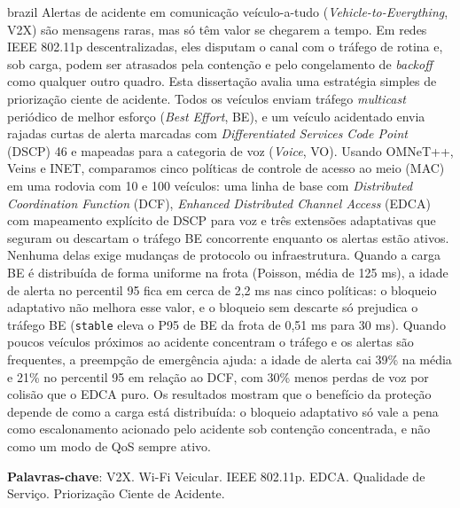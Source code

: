 \setlength{\absparsep}{18pt} %
\begin{resumo}[Resumo]
	\SingleSpacing
	\begin{otherlanguage*}{brazil}
	Alertas de acidente em comunicação veículo-a-tudo (\emph{Vehicle-to-Everything}, V2X) são mensagens raras, mas só têm valor se chegarem a tempo. Em redes IEEE 802.11p descentralizadas, eles disputam o canal com o tráfego de rotina e, sob carga, podem ser atrasados pela contenção e pelo congelamento de \emph{backoff} como qualquer outro quadro. Esta dissertação avalia uma estratégia simples de priorização ciente de acidente. Todos os veículos enviam tráfego \emph{multicast} periódico de melhor esforço (\emph{Best Effort}, BE), e um veículo acidentado envia rajadas curtas de alerta marcadas com \emph{Differentiated Services Code Point} (DSCP) 46 e mapeadas para a categoria de voz (\emph{Voice}, VO). Usando OMNeT++, Veins e INET, comparamos cinco políticas de controle de acesso ao meio (MAC) em uma rodovia com 10 e 100 veículos: uma linha de base com \emph{Distributed Coordination Function} (DCF), \emph{Enhanced Distributed Channel Access} (EDCA) com mapeamento explícito de DSCP para voz e três extensões adaptativas que seguram ou descartam o tráfego BE concorrente enquanto os alertas estão ativos. Nenhuma delas exige mudanças de protocolo ou infraestrutura. Quando a carga BE é distribuída de forma uniforme na frota (Poisson, média de 125 ms), a idade de alerta no percentil 95 fica em cerca de 2,2 ms nas cinco políticas: o bloqueio adaptativo não melhora esse valor, e o bloqueio sem descarte só prejudica o tráfego BE (\texttt{stable} eleva o P95 de BE da frota de 0,51 ms para 30 ms). Quando poucos veículos próximos ao acidente concentram o tráfego e os alertas são frequentes, a preempção de emergência ajuda: a idade de alerta cai 39\% na média e 21\% no percentil 95 em relação ao DCF, com 30\% menos perdas de voz por colisão que o EDCA puro. Os resultados mostram que o benefício da proteção depende de como a carga está distribuída: o bloqueio adaptativo só vale a pena como escalonamento acionado pelo acidente sob contenção concentrada, e não como um modo de QoS sempre ativo.

	\textbf{Palavras-chave}: V2X. Wi-Fi Veicular. IEEE 802.11p. EDCA. Qualidade de Serviço. Priorização Ciente de Acidente.
	\end{otherlanguage*}
\end{resumo}

